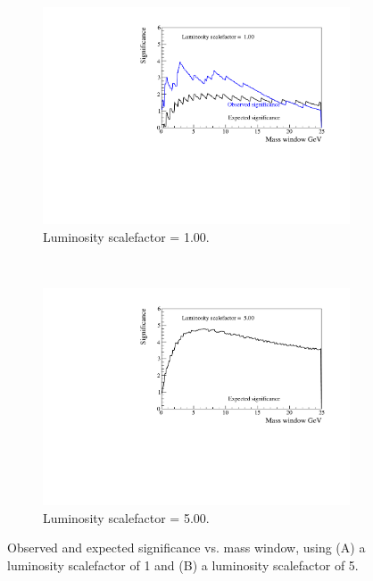 \documentclass[12pt,a4paper]{amsart}
\begin{document}
\begin{figure}[t!]
    \centering
    \begin{subfigure}[t]{0.6\textwidth}
        \centering
        \includegraphics[width=1\textwidth]{../data/11_1/Significance_Optimization_lumiscalefactor_1_00.pdf}
        \caption{Luminosity scalefactor = 1.00.}
		\label{fig:mass_windows_significance_lumFactor=1}
    \end{subfigure}%
    ~ 
    \begin{subfigure}[t]{0.6\textwidth}
        \centering
        \includegraphics[width=1\textwidth]{../data/11_1/Significance_Optimization_lumiscalefactor_5_00.pdf}
        \caption{Luminosity scalefactor = 5.00.}
    		\label{fig:mass_windows_significance_lumFactor=5}
	\end{subfigure}
	\caption{Observed and expected significance vs. mass window, using (A) a luminosity scalefactor of 1 and (B) a luminosity scalefactor of 5.}
\label{fig:mass_windows_significance}
\end{figure}
\end{document}
